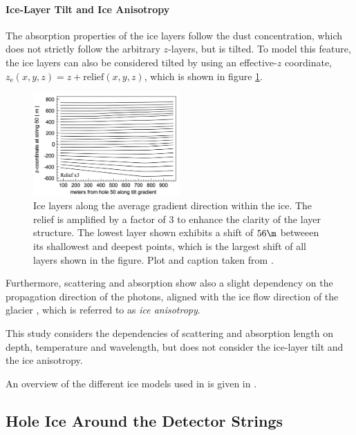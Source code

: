 \paragraph{Ice-Layer Tilt and Ice Anisotropy}
The absorption properties of the ice layers follow the dust concentration, which does not strictly follow the arbitrary $z$-layers, but is tilted. To model this feature, the ice layers can also be considered tilted by using an effective-$z$ coordinate, $z_\text{e}(x,y,z) = z + \text{relief}(x,y,z)$, which is shown in figure \ref{fig:wohr8uaY}. \cite{icepaper}

\begin{figure}[htbp]
  \centering
  \includegraphics[width=0.5\textwidth]{img/icepaper-fig-14-layers}
  \caption{Ice layers along the average gradient direction within the ice. The relief is amplified by a factor of 3 to enhance the clarity of the layer structure. The lowest layer shown exhibits a shift of $56\m$ betweeen its shallowest and deepest points, which is the largest shift of all layers shown in the figure. Plot and caption taken from \cite[figure 14]{icepaper}.}
  \label{fig:wohr8uaY}
\end{figure}

Furthermore, scattering and absorption show also a slight dependency on the propagation direction of the photons, aligned with the ice flow direction of the glacier \cite{icrc17pocam}, which is referred to as \textit{ice anisotropy}.

This study considers the dependencies of scattering and absorption length on depth, temperature and wavelength, but does not consider the ice-layer tilt and the ice anisotropy.

An overview of the different ice models used in \icecube is given in \cite{flasherdataderivedicemodels}.


\subsection{Hole Ice Around the Detector Strings}
\label{sec:hole_ice}

